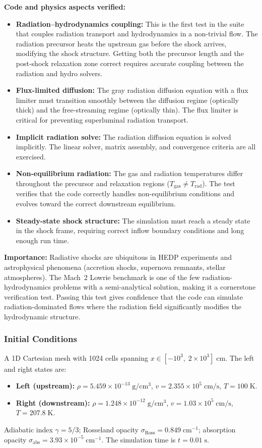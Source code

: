 \documentclass[11pt,a4paper]{article}
\begin{document}
\textbf{Code and physics aspects verified:}
\begin{itemize}
  \item \textbf{Radiation--hydrodynamics coupling:} This is the first test in the suite that couples radiation transport and hydrodynamics in a non-trivial flow. The radiation precursor heats the upstream gas before the shock arrives, modifying the shock structure. Getting both the precursor length and the post-shock relaxation zone correct requires accurate coupling between the radiation and hydro solvers.
  \item \textbf{Flux-limited diffusion:} The gray radiation diffusion equation with a flux limiter must transition smoothly between the diffusion regime (optically thick) and the free-streaming regime (optically thin). The flux limiter is critical for preventing superluminal radiation transport.
  \item \textbf{Implicit radiation solve:} The radiation diffusion equation is solved implicitly. The linear solver, matrix assembly, and convergence criteria are all exercised.
  \item \textbf{Non-equilibrium radiation:} The gas and radiation temperatures differ throughout the precursor and relaxation regions ($T_{\mathrm{gas}} \neq T_{\mathrm{rad}}$). The test verifies that the code correctly handles non-equilibrium conditions and evolves toward the correct downstream equilibrium.
  \item \textbf{Steady-state shock structure:} The simulation must reach a steady state in the shock frame, requiring correct inflow boundary conditions and long enough run time.
\end{itemize}

\textbf{Importance:} Radiative shocks are ubiquitous in HEDP experiments and astrophysical phenomena (accretion shocks, supernova remnants, stellar atmospheres). The Mach~2 Lowrie benchmark is one of the few radiation-hydrodynamics problems with a semi-analytical solution, making it a cornerstone verification test. Passing this test gives confidence that the code can simulate radiation-dominated flows where the radiation field significantly modifies the hydrodynamic structure.

\subsubsection*{Initial Conditions}
A 1D Cartesian mesh with 1024 cells spanning $x \in [-10^3,\;2\times10^3]\;\mathrm{cm}$. The left and right states are:
\begin{itemize}
  \item \textbf{Left (upstream):} $\rho = 5.459\times10^{-13}\;\mathrm{g/cm^3}$, $v = 2.355\times10^{5}\;\mathrm{cm/s}$, $T = 100\;\mathrm{K}$.
  \item \textbf{Right (downstream):} $\rho = 1.248\times10^{-12}\;\mathrm{g/cm^3}$, $v = 1.03\times10^{5}\;\mathrm{cm/s}$, $T = 207.8\;\mathrm{K}$.
\end{itemize}
Adiabatic index $\gamma = 5/3$; Rosseland opacity $\sigma_{\mathrm{Ross}} = 0.849\;\mathrm{cm^{-1}}$; absorption opacity $\sigma_{\mathrm{abs}} = 3.93\times10^{-5}\;\mathrm{cm^{-1}}$. The simulation time is $t = 0.01\;\mathrm{s}$.
\end{document}
